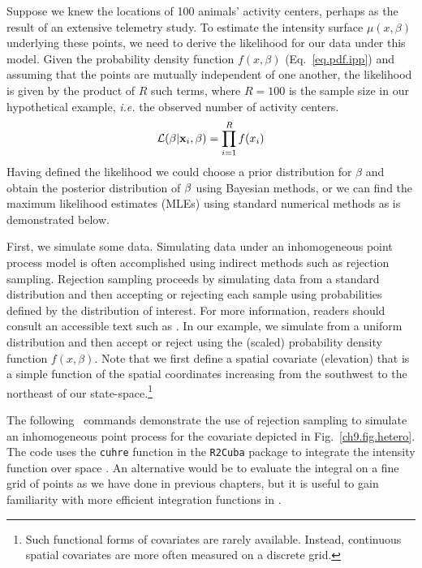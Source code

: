 Suppose we knew the locations of 100 animals' activity
centers, perhaps as the result of an extensive telemetry study. To
estimate the intensity surface $\mu(x, \beta)$ underlying these
points, we need to derive the likelihood for our data under this
model. Given the probability density function $f(x, \beta)$
(Eq.~\ref{eq.pdf.ipp}) and assuming that the points are
mutually independent of one another,
the likelihood is given by the product
of $R$ such terms, where $R=100$ is the sample size in our
hypothetical example,
\emph{i.e.} the observed number of activity centers.
\[
\mathcal{L}({\bf \beta} | {\bf x}_i, \beta) = \prod_{i=1}^R f(x_i)
\]
Having defined the likelihood we could choose a prior distribution for
$\beta$ and obtain the posterior distribution of
$\bf \beta$ using Bayesian methods, or we can find the maximum likelihood
estimates (MLEs) using standard numerical methods as is demonstrated
below.

First, we simulate some data. Simulating data under an inhomogeneous point process model is often
accomplished using indirect methods such as rejection
sampling. Rejection sampling proceeds by
simulating data from a standard distribution and then accepting or
rejecting each sample using probabilities defined by the distribution
of interest. For more information, readers should consult an
accessible text such as \citet{robert_casella:2010}. In our example, we
simulate from a uniform distribution and then accept or reject using
the (scaled) probability density function $f(x, \beta)$. Note that we first define a
spatial covariate (elevation) that is a simple function of the spatial
coordinates increasing from the southwest to the northeast of our
state-space.\footnote{Such functional forms of
covariates are rarely available. Instead,  continuous spatial
covariates are more often measured on a discrete grid.}

The following \R~commands demonstrate the use of rejection sampling to
simulate an inhomogeneous point process for the covariate depicted in
Fig.~\ref{ch9.fig.hetero}. The code uses the \verb+cuhre+ function in
the {\tt R2Cuba} package to integrate the intensity function over
space \citep{hahn_etal:2011}. An alternative would be to evaluate the
integral on a fine grid of points as we have done in previous
chapters, but it is useful to gain familiarity with more efficient
integration functions in \R.

